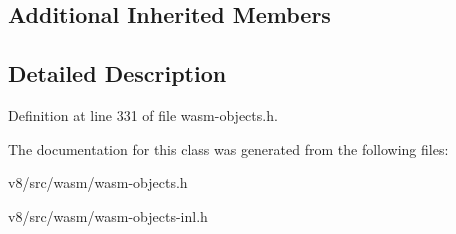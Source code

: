 \subsection*{Additional Inherited Members}


\subsection{Detailed Description}


Definition at line 331 of file wasm-\/objects.\+h.



The documentation for this class was generated from the following files\+:\begin{DoxyCompactItemize}
\item 
v8/src/wasm/wasm-\/objects.\+h\item 
v8/src/wasm/wasm-\/objects-\/inl.\+h\end{DoxyCompactItemize}
